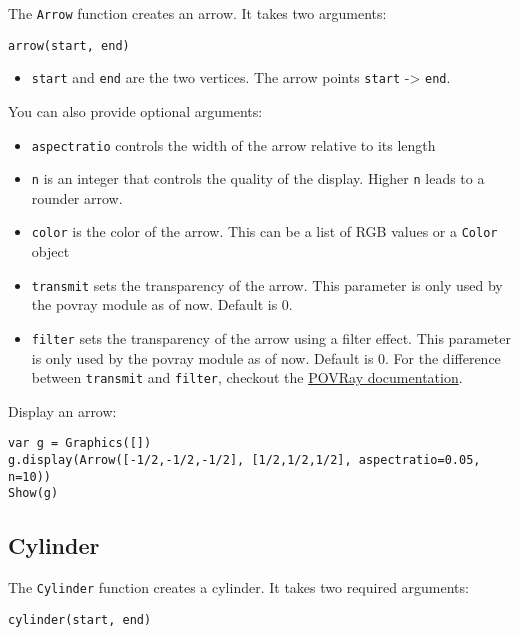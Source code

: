 The \texttt{Arrow} function creates an arrow. It takes two arguments:

\begin{lstlisting}
arrow(start, end)
\end{lstlisting}

\begin{itemize}

\item
  \texttt{start} and \texttt{end} are the two vertices. The arrow points
  \texttt{start} -\textgreater{} \texttt{end}.
\end{itemize}

You can also provide optional arguments:

\begin{itemize}

\item
  \texttt{aspectratio} controls the width of the arrow relative to its
  length
\item
  \texttt{n} is an integer that controls the quality of the display.
  Higher \texttt{n} leads to a rounder arrow.
\item
  \texttt{color} is the color of the arrow. This can be a list of RGB
  values or a \texttt{Color} object
\item
  \texttt{transmit} sets the transparency of the arrow. This parameter
  is only used by the povray module as of now. Default is 0.
\item
  \texttt{filter} sets the transparency of the arrow using a filter
  effect. This parameter is only used by the povray module as of now.
  Default is 0. For the difference between \texttt{transmit} and
  \texttt{filter}, checkout the
  \href{http://xahlee.info/3d/povray-glassy.html}{POVRay documentation}.
\end{itemize}

Display an arrow:

\begin{lstlisting}
var g = Graphics([])
g.display(Arrow([-1/2,-1/2,-1/2], [1/2,1/2,1/2], aspectratio=0.05, n=10))
Show(g)
\end{lstlisting}

\hypertarget{cylinder}{%
\subsection{Cylinder}\label{cylinder}}

The \texttt{Cylinder} function creates a cylinder. It takes two required
arguments:

\begin{lstlisting}
cylinder(start, end)
\end{lstlisting}

